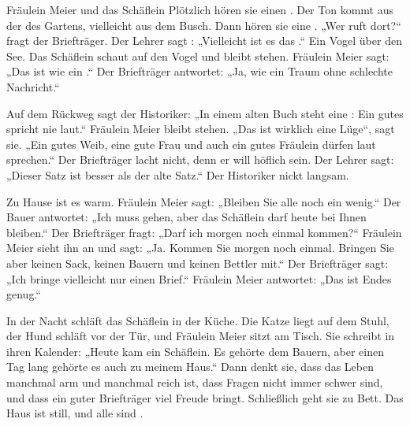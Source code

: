 \documentclass[12pt]{nextbook}
\begin{document}
\begin{readersection}{Fräulein Meier und das Schäflein}
Plötzlich hören sie einen . Der Ton kommt aus der  des Gartens, vielleicht aus dem Busch. Dann hören sie eine . „Wer ruft dort?“ fragt der Briefträger. Der Lehrer sagt : „Vielleicht ist es das .“ Ein Vogel  über den See. Das Schäflein schaut auf den Vogel und bleibt stehen. Fräulein Meier sagt: „Das ist wie ein .“ Der Briefträger antwortet: „Ja, wie ein Traum ohne schlechte Nachricht.“

Auf dem Rückweg sagt der Historiker: „In einem alten Buch steht eine : Ein gutes  spricht nie laut.“ Fräulein Meier bleibt stehen. „Das ist wirklich eine Lüge“, sagt sie. „Ein gutes Weib, eine gute Frau und auch ein gutes Fräulein dürfen laut sprechen.“ Der Briefträger lacht nicht, denn er will höflich sein. Der Lehrer sagt: „Dieser Satz ist besser als der alte Satz.“ Der Historiker nickt langsam.

Zu Hause ist es warm. Fräulein Meier sagt: „Bleiben Sie alle noch ein wenig.“ Der Bauer antwortet: „Ich muss gehen, aber das Schäflein darf heute bei Ihnen bleiben.“ Der Briefträger fragt: „Darf ich morgen noch einmal kommen?“ Fräulein Meier sieht ihn an und sagt: „Ja. Kommen Sie morgen noch einmal. Bringen Sie aber keinen Sack, keinen Bauern und keinen Bettler mit.“ Der Briefträger sagt: „Ich bringe vielleicht nur einen Brief.“ Fräulein Meier antwortet: „Das ist  Endes genug.“

In der Nacht schläft das Schäflein in der Küche. Die Katze liegt auf dem Stuhl, der Hund schläft vor der Tür, und Fräulein Meier sitzt am Tisch. Sie schreibt in ihren Kalender: „Heute kam ein Schäflein. Es gehörte dem Bauern, aber einen Tag lang gehörte es auch zu meinem Haus.“ Dann denkt sie, dass das Leben manchmal arm und manchmal reich ist, dass Fragen nicht immer schwer sind, und dass ein guter Briefträger viel Freude bringt. Schließlich geht sie zu Bett. Das Haus ist still, und alle sind .

\end{readersection}
\end{document}
